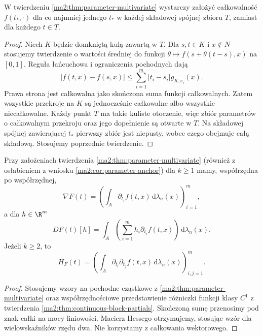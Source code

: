 \begin{wniosek}
\label{ma2:cor:parameter-anchor}
W twierdzeniu \ref{ma2:thm:parameter-multivariate}
wystarczy założyć całkowalność $f(t_*,\cdot)$
dla co najmniej jednego $t_*$ w każdej składowej
spójnej zbioru $T$, zamiast dla każdego $t\in T$.
\end{wniosek}
\begin{proof}
Niech $K$ będzie domkniętą kulą zawartą w $T$.
Dla $s,t\in K$ i $x\notin N$ stosujemy
twierdzenie o wartości średniej do funkcji
$\theta\mapsto f(s+\theta(t-s),x)$ na $[0,1]$.
Reguła łańcuchowa i ograniczenia pochodnych dają
\[
 |f(t,x)-f(s,x)|\le
 \sum_{i=1}^m |t_i-s_i|g_{K,e_i}(x).
\]
Prawa strona jest całkowalna jako skończona suma
funkcji całkowalnych. Zatem wszystkie przekroje
na $K$ są jednocześnie całkowalne albo wszystkie
niecałkowalne. Każdy punkt $T$ ma takie kuliste
otoczenie, więc zbiór parametrów o całkowalnym
przekroju oraz jego dopełnienie są otwarte w $T$.
Na składowej spójnej zawierającej $t_*$ pierwszy
zbiór jest niepusty, wobec czego obejmuje całą
składową. Stosujemy poprzednie twierdzenie.
\end{proof}

\begin{wniosek}
\label{ma2:cor:parameter-gradient-hessian}
Przy założeniach twierdzenia
\ref{ma2:thm:parameter-multivariate} (również
z osłabieniem z wniosku \ref{ma2:cor:parameter-anchor})
dla $k\ge1$ mamy, współrzędna po współrzędnej,
\[
 \nabla F(t)=\left(
 \int_A\partial_{t_i}f(t,x)\,\mathrm d\lambda_n(x)
 \right)_{i=1}^m,
\]
a dla $h\in\R^m$
\[
 DF(t)[h]=\int_A
 \left(\sum_{i=1}^m h_i\partial_{t_i}f(t,x)\right)
 \,\mathrm d\lambda_n(x).
\]
Jeżeli $k\ge2$, to
\[
 H_F(t)=\left(
 \int_A\partial_{t_i}\partial_{t_j}f(t,x)
 \,\mathrm d\lambda_n(x)
 \right)_{i,j=1}^m.
\]
\end{wniosek}
\begin{proof}
Stosujemy wzory na pochodne cząstkowe z
\ref{ma2:thm:parameter-multivariate} oraz
współrzędnościowe przedstawienie różniczki
funkcji klasy $C^1$ z twierdzenia
\ref{ma2:thm:continuous-block-partials}.
Skończoną sumę przenosimy pod znak całki
na mocy liniowości. Macierz Hessego otrzymujemy,
stosując wzór dla wielowskaźników rzędu dwa.
Nie korzystamy z całkowania wektorowego.
\end{proof}

